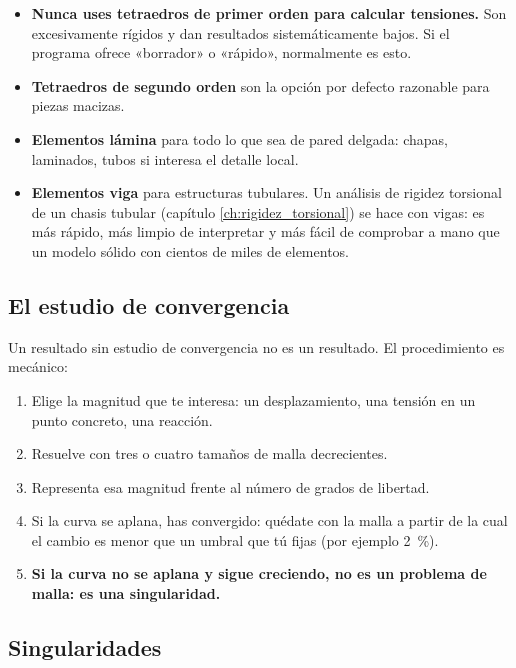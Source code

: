 \begin{itemize}
  \item \textbf{Nunca uses tetraedros de primer orden para calcular tensiones.}
        Son excesivamente rígidos y dan resultados sistemáticamente bajos. Si el
        programa ofrece «borrador» o «rápido», normalmente es esto.
  \item \textbf{Tetraedros de segundo orden} son la opción por defecto razonable
        para piezas macizas.
  \item \textbf{Elementos lámina} para todo lo que sea de pared delgada: chapas,
        laminados, tubos si interesa el detalle local.
  \item \textbf{Elementos viga} para estructuras tubulares. Un análisis de rigidez
        torsional de un chasis tubular (capítulo \ref{ch:rigidez_torsional}) se
        hace con vigas: es más rápido, más limpio de interpretar y más fácil de
        comprobar a mano que un modelo sólido con cientos de miles de elementos.
\end{itemize}

\subsection{El estudio de convergencia}

Un resultado sin estudio de convergencia no es un resultado. El procedimiento es
mecánico:

\begin{enumerate}
  \item Elige la magnitud que te interesa: un desplazamiento, una tensión en un
        punto concreto, una reacción.
  \item Resuelve con tres o cuatro tamaños de malla decrecientes.
  \item Representa esa magnitud frente al número de grados de libertad.
  \item Si la curva se aplana, has convergido: quédate con la malla a partir de
        la cual el cambio es menor que un umbral que tú fijas (por ejemplo
        \SI{2}{\percent}).
  \item \textbf{Si la curva no se aplana y sigue creciendo, no es un problema de
        malla: es una singularidad.}
\end{enumerate}

\subsection{Singularidades}

